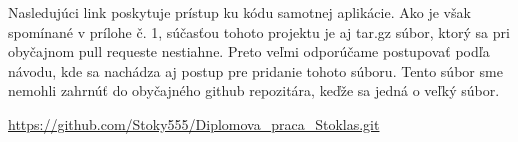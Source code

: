 Nasledujúci link poskytuje prístup ku kódu samotnej aplikácie. Ako je však spomínané v prílohe č. 1, súčasťou tohoto projektu je aj tar.gz súbor, ktorý sa pri obyčajnom pull requeste nestiahne. Preto veľmi odporúčame postupovať podľa návodu, kde sa nachádza aj postup pre pridanie tohoto súboru. Tento súbor sme nemohli zahrnúť do obyčajného github repozitára, keďže sa jedná o veľký súbor.

\url{https://github.com/Stoky555/Diplomova_praca_Stoklas.git}
